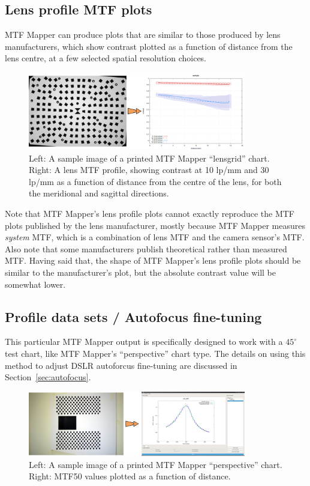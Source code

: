 \documentclass[a4paper]{article}
\begin{document}
\subsection{Lens profile MTF plots} 
\label{sec:lens_profile}
MTF Mapper can produce plots that are similar to those produced by lens
manufacturers, which show contrast plotted as a function of distance from
the lens centre, at a few selected spatial resolution choices.

\begin{figure}[!ht]
\centering
\includegraphics[width=0.85\textwidth]{figures/lensprofile_example}
\caption{Left: A sample image of a printed MTF Mapper ``lensgrid'' chart.
Right: A lens MTF profile, showing contrast at 10 lp/mm and 30 lp/mm as a
function of distance from the centre of the lens, for both the meridional
and sagittal directions.}
\label{fig:lensprofile}
\end{figure}

Note that MTF Mapper's lens profile plots cannot exactly reproduce the MTF
plots published by the lens manufacturer, mostly because MTF Mapper measures
\emph{system} MTF, which is a combination of lens MTF and the camera
sensor's MTF.  Also note that some manufacturers publish theoretical rather
than measured MTF.  Having said that, the shape of MTF Mapper's lens profile
plots should be similar to the manufacturer's plot, but the absolute
contrast value will be somewhat lower.

\subsection{Profile data sets / Autofocus fine-tuning} 
This particular MTF Mapper output is specifically designed to work with a
$45^\circ$ test chart, like MTF Mapper's ``perspective'' chart type. The
details on using this method to adjust DSLR autoforcus fine-tuning are
discussed in Section~\ref{sec:autofocus}.

\begin{figure}[!ht]
\centering
\includegraphics[width=0.85\textwidth]{figures/profile_example}
\caption{Left: A sample image of a printed MTF Mapper ``perspective'' chart.
Right: MTF50 values plotted as a function of distance.}
\label{fig:profile_example}
\end{figure}
\end{document}
